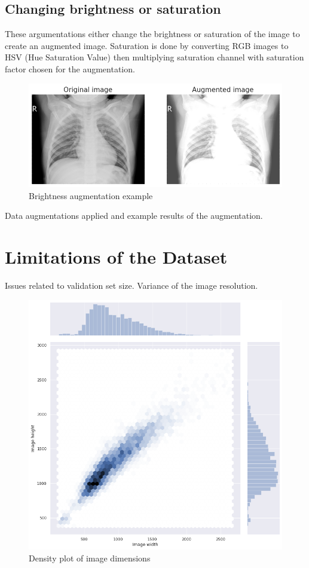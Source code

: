 \subsection{Changing brightness or saturation}
These argumentations either change the brightness or saturation of the image to create an augmented image.
Saturation is done by converting RGB images to HSV (Hue Saturation Value) then multiplying saturation channel with saturation factor chosen for the augmentation.

\begin{figure}[H]
    \centering
    \includegraphics[width=\textwidth]{img/augmented-image-1596666691.png}
    \caption{Brightness augmentation example}
    \label{fig:brightedxray}
  \end{figure}

Data augmentations applied and example results of the augmentation.

\section{Limitations of the Dataset}
Issues related to validation set size. Variance of the image resolution.

\begin{figure}[H]
    \centering
    \includegraphics[width=\textwidth]{img/image_dims_density.png}
    \caption{Density plot of image dimensions}
    \label{fig:imagedimensions}
  \end{figure}

